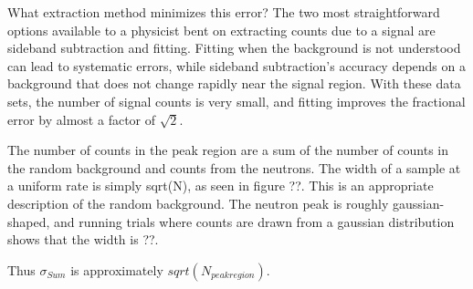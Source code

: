 What extraction method minimizes this error?  The two most straightforward options available to a physicist bent on extracting counts due to a signal are sideband subtraction and fitting.  Fitting when the background is not understood can lead to systematic errors, while sideband subtraction's accuracy depends on a background that does not change rapidly near the signal region.  With these data sets, the number of signal counts is very small, and fitting improves the fractional error by almost a factor of $\sqrt{2}$.

The number of counts in the peak region are a sum of the number of counts in the random background and counts from the neutrons.  The width of a sample at a uniform rate is simply sqrt(N), as seen in figure ??.  This is an appropriate description of the random background.  The neutron peak is roughly gaussian-shaped, and running trials where counts are drawn from a gaussian distribution shows that the width is ??.

Thus $\sigma_{Sum}$ is approximately $sqrt(N_{peakregion})$.

